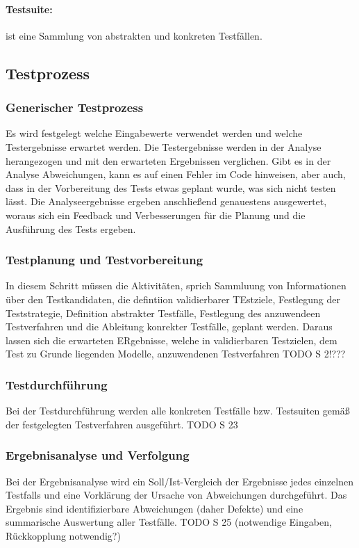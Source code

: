 \paragraph{Testsuite:} ist eine Sammlung von abstrakten und konkreten Testfällen.

\subsection{Testprozess}
\subsubsection{Generischer Testprozess}
Es wird festgelegt welche Eingabewerte verwendet werden und welche Testergebnisse erwartet werden. Die Testergebnisse werden in der Analyse herangezogen und mit den erwarteten Ergebnissen verglichen. Gibt es in der Analyse Abweichungen, kann es auf einen Fehler im Code hinweisen, aber auch, dass in der Vorbereitung des Tests etwas geplant wurde, was sich nicht testen lässt. Die Analyseergebnisse ergeben anschließend genauestens ausgewertet, woraus sich ein Feedback und Verbesserungen für die Planung und die Ausführung des Tests ergeben. 

\subsubsection{Testplanung und Testvorbereitung}
In diesem Schritt müssen die Aktivitäten, sprich Sammluung von Informationen über den Testkandidaten, die defintiion validierbarer TEstziele, Festlegung der Teststrategie, Definition abstrakter Testfälle, Festlegung des anzuwendeen Testverfahren und die Ableitung konrekter Testfälle, geplant werden.
Daraus lassen sich die erwarteten ERgebnisse, welche in validierbaren Testzielen, dem Test zu Grunde liegenden Modelle, anzuwendenen Testverfahren
TODO S 2!???

\subsubsection{Testdurchführung}
Bei der Testdurchführung werden alle konkreten Testfälle bzw. Testsuiten gemäß der festgelegten Testverfahren ausgeführt. 
TODO S 23

\subsubsection{Ergebnisanalyse und Verfolgung}
Bei der Ergebnisanalyse wird ein Soll/Ist-Vergleich der Ergebnisse jedes einzelnen Testfalls und eine Vorklärung der Ursache von Abweichungen durchgeführt. Das Ergebnis sind identifizierbare Abweichungen (daher Defekte) und eine summarische Auswertung aller Testfälle.
TODO S 25  (notwendige Eingaben, Rückkopplung notwendig?)

